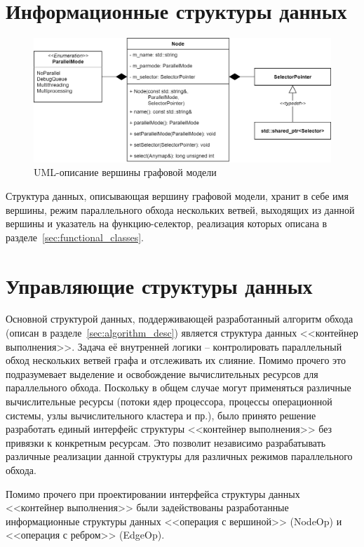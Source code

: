 \section{Информационные структуры данных}
\begin{figure}[!ht]
    \centering
    \includegraphics[height=0.25\textheight]{figures/class.node_v2.png}
    \caption{UML-описание вершины графовой модели}
    \label{fig.UMLNode}
\end{figure}
Структура данных, описывающая вершину графовой модели, хранит в себе имя вершины, режим параллельного обхода нескольких ветвей, выходящих из данной вершины и указатель на функцию-селектор, реализация которых описана в разделе~\ref{sec:functional_classes}.
\section{Управляющие структуры данных}
Основной структурой данных, поддерживающей разработанный алгоритм обхода (описан в разделе~\ref{sec:algorithm_desc}) является структура данных <<контейнер выполнения>>. Задача её внутренней логики -- контролировать параллельный обход нескольких ветвей графа и отслеживать их слияние. Помимо прочего это подразумевает выделение и освобождение вычислительных ресурсов для параллельного обхода. Поскольку в общем случае могут применяться различные вычислительные ресурсы (потоки ядер процессора, процессы операционной системы, узлы вычислительного кластера и пр.), было принято решение разработать единый интерфейс структуры <<контейнер выполнения>> без привязки к конкретным ресурсам. Это позволит независимо разрабатывать различные реализации данной структуры для различных режимов параллельного обхода.

Помимо прочего при проектировании интерфейса структуры данных <<контейнер выполнения>> были задействованы разработанные информационные структуры данных <<операция с вершиной>> (\textsf{NodeOp}) и <<операция с ребром>> (\textsf{EdgeOp}).

